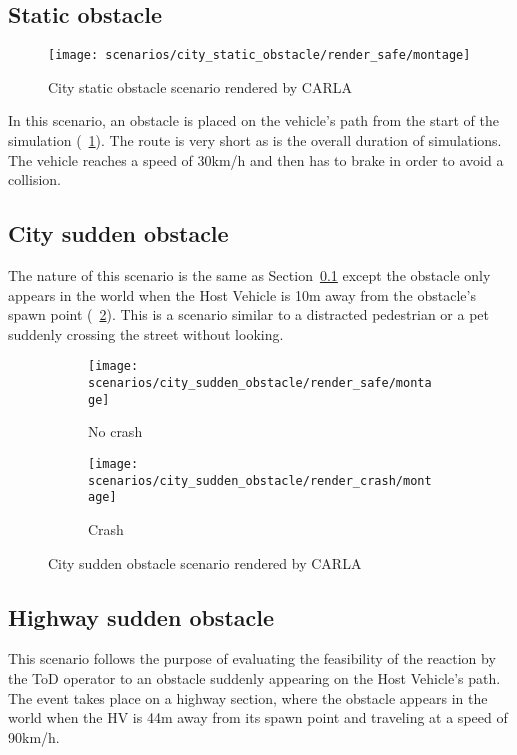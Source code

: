 \subsection{Static obstacle}
\label{subsec:scenarios:city_static_obstacle}

\begin{figure}[h]
    \centering
    \texttt{[image: scenarios/city\_static\_obstacle/render\_safe/montage]}
    \caption{City static obstacle scenario rendered by CARLA}
    \label{fig:scenarios_static_obs_safe}
\end{figure}
In this scenario, an obstacle is placed on the vehicle's path from the start of the simulation (\figurename~\ref{fig:scenarios_static_obs_safe}). The route is very short as is the overall duration of simulations. The vehicle reaches a speed of 30km/h and then has to brake in order to avoid a collision.

\subsection{City sudden obstacle}
The nature of this scenario is the same as Section~\ref{subsec:scenarios:city_static_obstacle} except the obstacle only appears in the world when the Host Vehicle is 10m away from the obstacle's spawn point (\figurename~\ref{fig:scenarios_sudden_obs_safe_crash}). This is a scenario similar to a distracted pedestrian or a pet suddenly crossing the street without looking.

\begin{figure}[h]
    \centering
    \begin{subfigure}[b]{\textwidth}
        \centering
        \texttt{[image: scenarios/city\_sudden\_obstacle/render\_safe/montage]}
        \caption{No crash}
    \end{subfigure}
    \hfill
    \begin{subfigure}[b]{\textwidth}
        \centering
        \texttt{[image: scenarios/city\_sudden\_obstacle/render\_crash/montage]}
        \caption{Crash}
    \end{subfigure}
    \caption{City sudden obstacle scenario rendered by CARLA}
    \label{fig:scenarios_sudden_obs_safe_crash}
\end{figure}


\subsection{Highway sudden obstacle}
This scenario follows the purpose of evaluating the feasibility of the reaction by the ToD operator to an obstacle suddenly appearing on the Host Vehicle's path. The event takes place on a highway section, where the obstacle appears in the world when the HV is 44m away from its spawn point and traveling at a speed of 90km/h.


